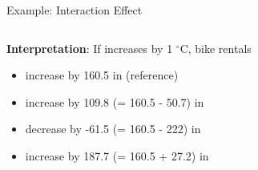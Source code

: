 \documentclass[11pt,compress,t,notes=noshow, aspectratio=169, xcolor=table]{beamer}
\begin{document}
\begin{frame}{Example: Interaction Effect}
\begin{columns}[T, totalwidth=\linewidth]
\end{columns}
\vfill
\pause
\begin{columns}[T, totalwidth=\linewidth]
\begin{column}{0.65\linewidth}
\textbf{Interpretation}: If  increases by 1 $^{\circ}$C, bike rentals
\begin{itemize}[<+->]
    \item increase by 160.5 in  (reference)
    \item increase by 109.8 (= 160.5 - 50.7) in 
    \item decrease by -61.5 (= 160.5 - 222) in 
    \item increase by 187.7 (= 160.5 + 27.2) in 
\end{itemize} %
\end{column}
\begin{column}{0.35\linewidth}
\end{column}
\end{columns}
\end{frame}
\end{document}
